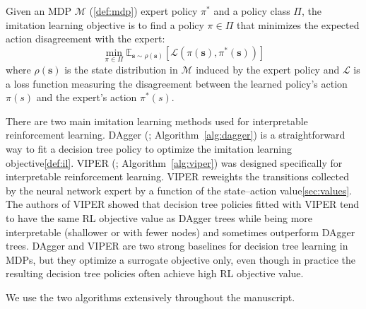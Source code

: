\begin{definition}\label{def:il}
Given an MDP $\mathcal{M}$ (\ref{def:mdp}) expert policy $\pi^*$ and a policy class $\Pi$, the imitation learning objective is to find a policy $\pi \in \Pi$ that minimizes the expected action disagreement with the expert:
\begin{equation}
\min_{\pi \in \Pi} \mathbb{E}_{\boldsymbol{s} \sim \rho(\boldsymbol{s})} \left[ \mathcal{L}(\pi(\boldsymbol{s}), \pi^*(\boldsymbol{s})) \right]
\end{equation}
where $\rho(\boldsymbol{s})$ is the state distribution in $\mathcal{M}$ induced by the expert policy and $\mathcal{L}$ is a loss function measuring the disagreement between the learned policy's action $\pi(s)$ and the expert's action $\pi^*(s)$.
\end{definition}

There are two main imitation learning methods used for interpretable reinforcement learning.
DAgger (\cite{PIRL}; Algorithm~\ref{alg:dagger}) is a straightforward way to fit a decision tree policy to optimize the imitation learning objective\ref{def:il}.
VIPER (\cite{viper}; Algorithm~\ref{alg:viper}) was designed specifically for interpretable reinforcement learning.
VIPER reweights the transitions collected by the neural network expert by a function of the state–action value\ref{sec:values}.
The authors of VIPER showed that decision tree policies fitted with VIPER tend to have the same RL objective value as DAgger trees while being more interpretable (shallower or with fewer nodes) and sometimes outperform DAgger trees.
DAgger and VIPER are two strong baselines for decision tree learning in MDPs, but they optimize a surrogate objective only, even though in practice the resulting decision tree policies often achieve high RL objective value.

We use the two algorithms extensively throughout the manuscript.


